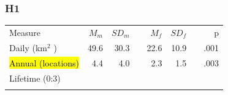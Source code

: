 \documentclass{beamer}
\makeatletter
\newcommand\SoulColor{%
  \let\set@color\beamerorig@set@color
  \let\reset@color\beamerorig@reset@color}
\makeatother
\begin{document}

\begin{frame}
\frametitle{H1}
\begin{table}
\begin{tabular}{lrrrrrrr}
\hline\noalign{\smallskip}
Measure & $M_{m}$ & $SD_{m}$ && $M_{f}$ & $SD_{f}$ && p \\
\noalign{\smallskip}\hline\noalign{\smallskip}
Daily (km$^{2}$ ) & 49.6 & 30.3 && 22.6 & 10.9 && .001 \\
\SoulColor\hl{Annual (locations)} & 4.4 & 4.0 && 2.3& 1.5 && .003 \\
Lifetime (0:3) &&&&&&& \\
\noalign{\smallskip}\hline
\end{tabular}\par
\end{table}		  

\end{frame}

\end{document}
